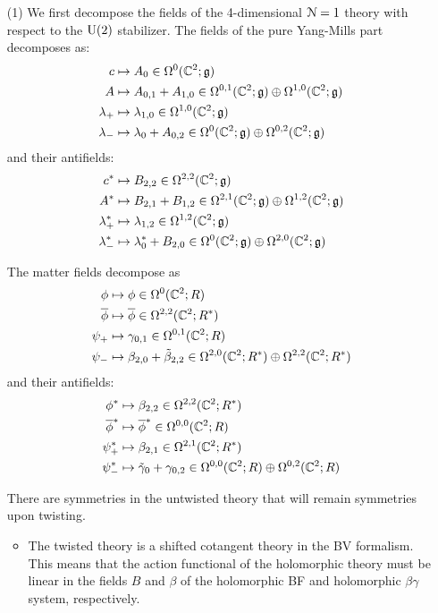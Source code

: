 \documentclass[10pt, oneside]{article}
\begin{document}
\begin{itemize}
\item[(1)] 
We first decompose the fields of the 4-dimensional $\mathcal{N}=1$ theory with respect to the ${\rm U}(2)$ stabilizer.
The fields of the pure Yang-Mills part decomposes as:
\begin{align*}
c & \mapsto A_{0} \in \Omega^0(\mathbb C^2 ; \mathfrak g) \\
A & \mapsto A_{0,1} + A_{1,0} \in \Omega^{0,1}(\mathbb C^2 ; \mathfrak g) \oplus \Omega^{1,0}(\mathbb C^2 ; \mathfrak g) \\
\lambda_+ & \mapsto \lambda_{1,0} \in \Omega^{1,0}(\mathbb C^2 ; \mathfrak g) \\
\lambda_- & \mapsto \lambda_0 + A_{0,2} \in \Omega^{0}(\mathbb C^2 ; \mathfrak g) \oplus \Omega^{0,2}(\mathbb C^2 ; \mathfrak g) 
\end{align*}
and their antifields:
\begin{align*}
c^* & \mapsto B_{2,2} \in \Omega^{2,2}(\mathbb C^2 ; \mathfrak g) \\
A^* & \mapsto B_{2,1} + B_{1,2} \in \Omega^{2,1}(\mathbb C^2;\mathfrak g) \oplus \Omega^{1,2}(\mathbb C^2; \mathfrak g) \\
\lambda^*_+ & \mapsto \lambda_{1,2} \in \Omega^{1,2}(\mathbb C^2 ; \mathfrak g) \\
\lambda^*_- & \mapsto \lambda_0^*+ B_{2,0} \in \Omega^{0}(\mathbb C^2 ; \mathfrak g) \oplus \Omega^{2,0}(\mathbb C^2 ; \mathfrak g) 
\end{align*}

The matter fields decompose as
\begin{align*}
\phi & \mapsto \phi \in \Omega^0 (\mathbb C^2 ; R) \\
\overline{\phi} & \mapsto \overline{\phi} \in \Omega^{2,2}(\mathbb C^2 ; R^*) \\
\psi_+ & \mapsto \gamma_{0,1} \in \Omega^{0,1}(\mathbb C^2 ; R) \\
\psi_- & \mapsto \beta_{2,0} + \Tilde{\beta}_{2,2} \in \Omega^{2,0}(\mathbb C^2 ; R^*) \oplus \Omega^{2,2}(\mathbb C^2 ; R^*) 
\end{align*}
and their antifields:
\begin{align*}
\phi^* & \mapsto \beta_{2,2} \in \Omega^{2,2} (\mathbb C^2 ; R^*) \\
\overline{\phi}^* & \mapsto \overline{\phi}^* \in \Omega^{0,0}(\mathbb C^2 ; R) \\
\psi^*_+ & \mapsto \beta_{2,1} \in \Omega^{2,1}(\mathbb C^2 ; R^*) \\
\psi^*_- & \mapsto \Tilde{\gamma}_0 + \gamma_{0,2} \in \Omega^{0,0}(\mathbb C^2 ; R) \oplus \Omega^{0,2}(\mathbb C^2 ; R) 
\end{align*}

There are symmetries in the untwisted theory that will remain symmetries upon twisting. 
\begin{itemize}
\item The twisted theory is a shifted cotangent theory in the BV formalism. 
This means that the action functional of the holomorphic theory must be linear in the fields $B$ and $\beta$ of the holomorphic BF and holomorphic $\beta\gamma$ system, respectively. 


\end{itemize}
\end{itemize}
\end{document}
